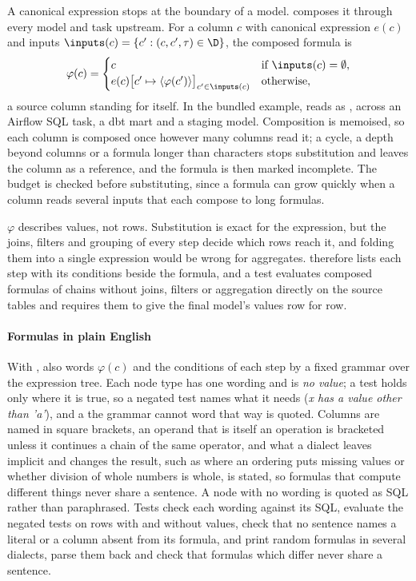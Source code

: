 A canonical expression stops at the boundary of a model.  composes it
through every model and task upstream. For a column $c$ with canonical expression $e(c)$ and
inputs $\inputs(c) = \{c' : (c, c', \tau) \in \D\}$, the composed formula is
\begin{equation}
  \varphi(c) =
  \begin{cases}
    c & \text{if } \inputs(c) = \emptyset,\\
    e(c)\big[c' \mapsto \langle \varphi(c') \rangle\big]_{c' \in \inputs(c)} & \text{otherwise},
  \end{cases}
  \label{eq:compose}
\end{equation}
a source column standing for itself. In the bundled example,  reads as
\cmd{\exLtvFormula{}}, across an Airflow SQL task, a dbt mart and a staging model. Composition is
memoised, so each column is composed once however many columns read it; a cycle, a depth beyond
\maxDepth{} columns or a formula longer than \maxComposed{} characters stops substitution and
leaves the column as a reference, and the formula is then marked incomplete. The budget is checked
before substituting, since a formula can grow quickly when a column reads several inputs that
each compose to long formulas.

$\varphi$ describes values, not rows. Substitution is exact for the expression, but the joins,
filters and grouping of every step decide which rows reach it, and folding them into a single
expression would be wrong for aggregates.  therefore lists each step with its
conditions beside the formula, and a test evaluates composed formulas of chains without joins,
filters or aggregation directly on the source tables and requires them to give the final model's
values row for row.

\paragraph{Formulas in plain English}
With ,  also words $\varphi(c)$ and the conditions of each step by a
fixed grammar over the expression tree. Each node type has one wording and  is
\emph{no value}; a test holds only where it is true, so a negated test names what it needs
(\emph{x has a value other than 'a'}), and a  the grammar cannot word that way is
quoted. Columns are named in square brackets, an operand that is itself an operation is bracketed
unless it continues a chain of the same operator, and what a dialect leaves implicit and changes
the result, such as where an ordering puts missing values or whether division of whole numbers
is whole, is stated, so formulas that compute different things never share a sentence. A node
with no wording is quoted as SQL rather than paraphrased. Tests check each wording against its
SQL, evaluate the negated tests on rows with and without values, check that no sentence names a
literal or a column absent from its formula, and print random formulas in several dialects, parse
them back and check that formulas which differ never share a sentence.

